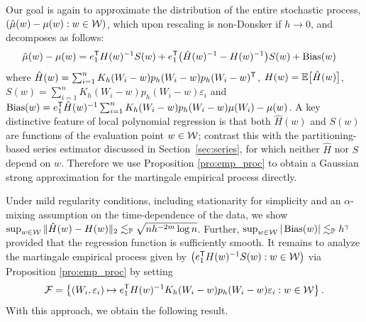Our goal is again to approximate the distribution of the entire stochastic
process, $(\hat{\mu}(w)-\mu(w):w\in\mathcal{W})$, which upon rescaling is non-Donsker
if $h \to 0$, and decomposes as follows:
%
\begin{align*}
  \hat{\mu}(w)-\mu(w)
  &= e_1^{\mathsf{T}} H(w)^{-1} S(w)
  + e_1^{\mathsf{T}} \big(\hat H(w)^{-1} - H(w)^{-1}\big) S(w)
  + \operatorname{Bias}(w)
\end{align*}
%
where
$\hat H(w) = \sum_{i=1}^n K_h(W_i-w) p_h(W_i-w) p_h(W_i-w)^{\mathsf{T}}$,
$H(w) = \mathbb{E} \big[ \hat H(w) \big]$,
$S(w)= \sum_{i=1}^n K_h(W_i-w) p_h(W_i-w) \varepsilon_i$
and
$\operatorname{Bias}(w) = e_1^{\mathsf{T}} \hat H(w)^{-1}
\sum_{i=1}^n K_h(W_i-w) p_h(W_i-w) \mu(W_i) - \mu(w)$.
A key distinctive feature of local polynomial regression is that both
$\hat H(w)$ and $S(w)$ are functions of the evaluation point $w\in\mathcal{W}$;
contrast this with the partitioning-based series estimator discussed in
Section~\ref{sec:series}, for which neither $\hat H$ nor $S$ depend on $w$.
Therefore we use Proposition \ref{pro:emp_proc} to obtain a Gaussian strong
approximation for the martingale empirical process directly.

Under mild regularity conditions, including stationarity for simplicity
and an $\alpha$-mixing assumption on the time-dependence of the data, we show
$\sup_{w\in\mathcal{W}} \|\hat H(w)-H(w)\|_2
\lesssim_{\mathbb{P}} \sqrt{n h^{-2m}\log n}$.
Further,
$\sup_{w\in\mathcal{W}} |\operatorname{Bias}(w)|
\lesssim_{\mathbb{P}} h^\gamma$
provided that the regression function is sufficiently smooth.
It remains to analyze the martingale empirical process given by
$\big(e_1^{\mathsf{T}} H(w)^{-1} S(w) : w\in\mathcal{W}\big)$
via Proposition \ref{pro:emp_proc} by setting
%
\begin{align*}
  \mathcal{F} = \left\{
    (W_i, \varepsilon_i) \mapsto
    e_1^{\mathsf{T}} H(w)^{-1}
    K_h(W_i-w) p_h(W_i-w) \varepsilon_i
    : w \in \mathcal{W}
  \right\}.
\end{align*}
%
With this approach, we obtain the following result.

